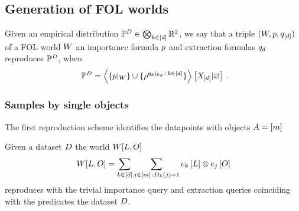 


\subsection{Generation of FOL worlds}


\begin{definition}
	Given an empirical distribution $\mathbb{P}^{D}\in\bigotimes_{k\in[d]}\mathbb{R}^2$, we say that a triple $(W,p,q_{[d]})$ of a FOL world $W$ an importance formula $p$ and extraction formulas $q_{d}$ reproduces $\mathbb{P}^{D}$, when 
		\[ \empdistribution = \normationof{\{\groundingof{\impformula}\}\cup\{\rencodingof{\kggroundingof{\extformulaof{\atomenumerator}}\, : \, \atomenumeratorin}\}}{\shortcatvariables} \, .  \]
\end{definition}


\subsubsection{Samples by single objects}

The first reproduction scheme identifies the datapoints with objects $A=[m]$

\begin{theorem}
	Given a dataset $D$ the world $W[L,O]$ 
	\begin{align*}
		W[L,O] = \sum_{k\in[d]} \sum_{j\in[m] \, : D_{k}(j)=1} e_{k}\left[L\right] \otimes e_{j}\left[O\right]
	\end{align*}
	reproduces with the trivial importance query and extraction queries coinciding with the predicates the dataset $D$.
\end{theorem}



